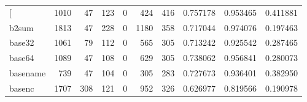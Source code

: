\begin{longtable}{lrrrrrrrrr}
\bottomrule
\endlastfoot
{[}         &                                               1010 &                                                 47 &                                                123 &                                                  0 &                                                424 &                                                416 &                                           0.757178 &                               0.953465 &                             0.411881 \\
b2sum     &                                               1813 &                                                 47 &                                                228 &                                                  0 &                                               1180 &                                                358 &                                           0.717044 &                               0.974076 &                             0.197463 \\
base32    &                                               1061 &                                                 79 &                                                112 &                                                  0 &                                                565 &                                                305 &                                           0.713242 &                               0.925542 &                             0.287465 \\
base64    &                                               1089 &                                                 47 &                                                108 &                                                  0 &                                                629 &                                                305 &                                           0.738062 &                               0.956841 &                             0.280073 \\
basename  &                                                739 &                                                 47 &                                                104 &                                                  0 &                                                305 &                                                283 &                                           0.727673 &                               0.936401 &                             0.382950 \\
basenc    &                                               1707 &                                                308 &                                                121 &                                                  0 &                                                952 &                                                326 &                                           0.626977 &                               0.819566 &                             0.190978 \\

\end{longtable}
